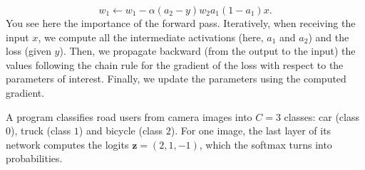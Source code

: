 \documentclass[11pt, a4paper]{exam}
\begin{document}
\begin{exercises}
\begin{parts}
    \begin{solution}
        \[
            w_1 \leftarrow w_1 - \alpha (a_2 - y)w_2 a_1(1-a_1)x.
        \]
        You see here the importance of the forward pass. Iteratively, when receiving the input $x$, we compute all the intermediate activations (here, $a_1$ and $a_2$) and the loss (given $y$). Then, we propagate backward (from the output to the input) the values following the chain rule for the gradient of the loss with respect to the parameters of interest. Finally, we update the parameters using the computed gradient.
    \end{solution}
\end{parts}


A program classifies road users from camera images into $C = 3$ classes: car (class $0$), truck (class $1$) and bicycle (class $2$). For one image, the last layer of its network computes the logits $\mathbf{z} = (2, 1, -1)$, which the softmax turns into probabilities.

\end{exercises}
\end{document}
